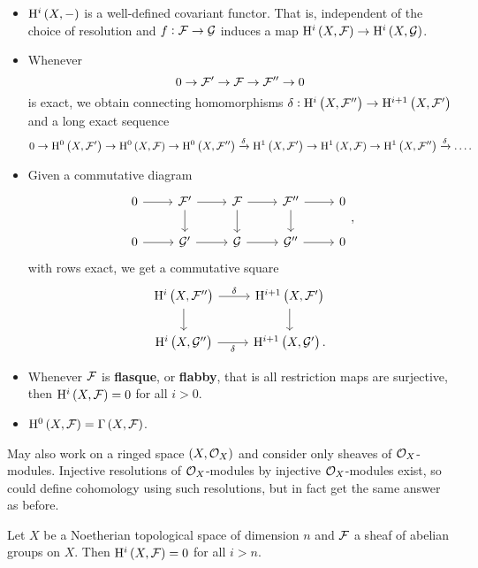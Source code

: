 \begin{proposition}
\hfill
\begin{itemize}
\item $ \H^i\br{X, -} $ is a well-defined covariant functor. That is, independent of the choice of resolution and $ f : \mathcal{F} \to \mathcal{G} $ induces a map $ \H^i\br{X, \FFF} \to \H^i\br{X, \GGG} $.
\item Whenever
$$ 0 \to \mathcal{F}' \to \mathcal{F} \to \mathcal{F}'' \to 0 $$
is exact, we obtain connecting homomorphisms $ \delta : \H^i\br{X, \FFF''} \to \H^{i + 1}\br{X, \FFF'} $ and a long exact sequence
$$ 0 \to \H^0\br{X, \FFF'} \to \H^0\br{X, \FFF} \to \H^0\br{X, \FFF''} \xrightarrow{\delta} \H^1\br{X, \FFF'} \to \H^1\br{X, \FFF} \to \H^1\br{X, \FFF''} \xrightarrow{\delta} \dots. $$
\item Given a commutative diagram
$$
\begin{tikzcd}
0 \arrow{r} & \FFF' \arrow{r} \arrow{d} & \FFF \arrow{r} \arrow{d} & \FFF'' \arrow{r} \arrow{d} & 0 \\
0 \arrow{r} & \GGG' \arrow{r} & \GGG \arrow{r} & \GGG'' \arrow{r} & 0
\end{tikzcd},
$$
with rows exact, we get a commutative square
$$
\begin{tikzcd}
\H^i\br{X, \FFF''} \arrow{r}{\delta} \arrow{d} & \H^{i + 1}\br{X, \FFF'} \arrow{d} \\
\H^i\br{X, \GGG''} \arrow{r}[swap]{\delta} & \H^{i + 1}\br{X, \GGG'}.
\end{tikzcd}
$$
\item Whenever $ \mathcal{F} $ is \textbf{flasque}, or \textbf{flabby}, that is all restriction maps are surjective, then $ \H^i\br{X, \FFF} = 0 $ for all $ i > 0 $.
\item $ \H^0\br{X, \FFF} = \Gamma\br{X, \FFF} $.
\end{itemize}
\end{proposition}

\begin{remark*}
May also work on a ringed space $ \br{X, \OOO_X} $ and consider only sheaves of $ \mathcal{O}_X $-modules. Injective resolutions of $ \mathcal{O}_X $-modules by injective $ \mathcal{O}_X $-modules exist, so could define cohomology using such resolutions, but in fact get the same answer as before.
\end{remark*}

\begin{theorem}[Grothendieck]
Let $ X $ be a Noetherian topological space of dimension $ n $ and $ \mathcal{F} $ a sheaf of abelian groups on $ X $. Then $ \H^i\br{X, \FFF} = 0 $ for all $ i > n $.
\end{theorem}

